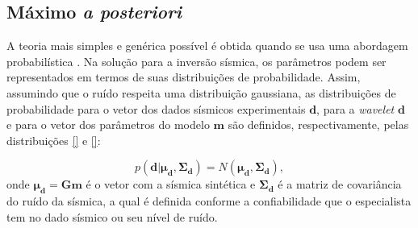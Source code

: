 % 
% 
% 
% 
% 

\subsection{Máximo \textit{a posteriori}}
\label{sec:map}

A teoria mais simples e genérica possível é obtida quando se usa uma
abordagem probabilística \citep{tarantola}.
Na solução para a inversão sísmica, os parâmetros podem ser representados em
termos de suas distribuições de probabilidade.
Assim, assumindo que o ruído respeita uma distribuição gaussiana,
as distribuições de probabilidade para o vetor dos
dados sísmicos experimentais $\boldsymbol{d}$, para a \textit{wavelet} $\boldsymbol{d}$ e para
o vetor dos parâmetros do modelo $\boldsymbol{m}$ são
definidos, respectivamente, pelas distribuições \ref{} e \ref{}:

% 
\begin{equation}
p(\boldsymbol{d}|\boldsymbol{\mu_{d}},\boldsymbol{\Sigma_{d}}) =
N(\boldsymbol{\mu_{d}},\boldsymbol{\Sigma_{d}}),
\end{equation}
onde $\boldsymbol{\mu_{d}} = \boldsymbol{Gm}$ é o vetor com a sísmica
sintética e $\boldsymbol{\Sigma_{d}}$ é a matriz de covariância do ruído da
sísmica, a qual é definida conforme a confiabilidade que o especialista tem no
dado sísmico ou seu nível de ruído.

